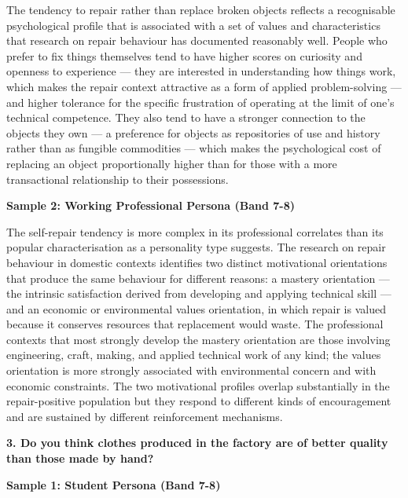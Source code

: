 The tendency to repair rather than replace broken objects reflects a recognisable psychological profile that is associated with a set of values and characteristics that research on repair behaviour has documented reasonably well. People who prefer to fix things themselves tend to have higher scores on curiosity and openness to experience — they are interested in understanding how things work, which makes the repair context attractive as a form of applied problem-solving — and higher tolerance for the specific frustration of operating at the limit of one's technical competence. They also tend to have a stronger connection to the objects they own — a preference for objects as repositories of use and history rather than as fungible commodities — which makes the psychological cost of replacing an object proportionally higher than for those with a more transactional relationship to their possessions.

\textbf{Sample 2: Working Professional Persona (Band 7-8)}

The self-repair tendency is more complex in its professional correlates than its popular characterisation as a personality type suggests. The research on repair behaviour in domestic contexts identifies two distinct motivational orientations that produce the same behaviour for different reasons: a mastery orientation — the intrinsic satisfaction derived from developing and applying technical skill — and an economic or environmental values orientation, in which repair is valued because it conserves resources that replacement would waste. The professional contexts that most strongly develop the mastery orientation are those involving engineering, craft, making, and applied technical work of any kind; the values orientation is more strongly associated with environmental concern and with economic constraints. The two motivational profiles overlap substantially in the repair-positive population but they respond to different kinds of encouragement and are sustained by different reinforcement mechanisms.

\separator

\begin{ieltsquestion}
\textbf{3. Do you think clothes produced in the factory are of better quality than those made by hand?}
\end{ieltsquestion}
\textbf{Sample 1: Student Persona (Band 7-8)}

